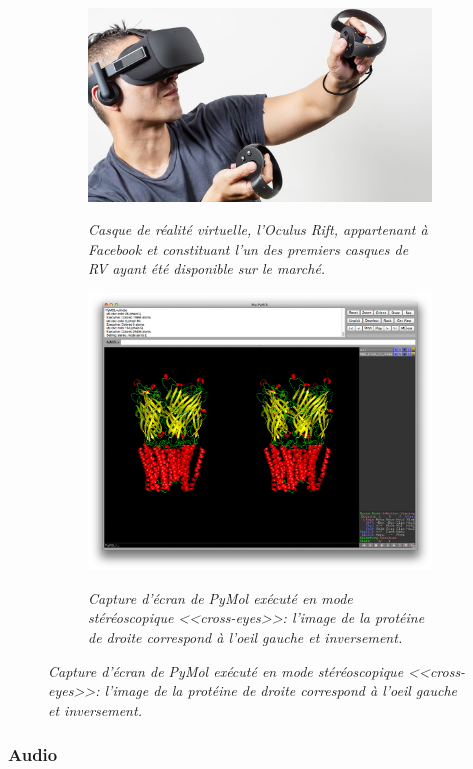 \begin{figure}
\begin{subfigure}{.5\textwidth}
  \centering
  {\includegraphics[width=.75\linewidth]{./figures/ch2/occulus}}
    \caption{{\it Casque de réalité virtuelle, l'Oculus Rift, appartenant à Facebook et constituant l'un des premiers casques de RV ayant été disponible sur le marché.}}
  \label{Fig:occulus}
  \hspace{0.3cm}
\end{subfigure}
\begin{subfigure}{.5\textwidth}
  \centering
  {\includegraphics[width=.75\linewidth]{./figures/ch2/pymol_stereo}}
    \caption{{\it Capture d'écran de PyMol exécuté en mode stéréoscopique <<cross-eyes>>: l'image de la protéine de droite correspond à l'oeil gauche et inversement.}}
  \label{Fig:pymol_stereo}
  \hspace{0.3cm}
\end{subfigure}
\end{figure}



\subsubsection{Audio} \label{immersion_audio}

